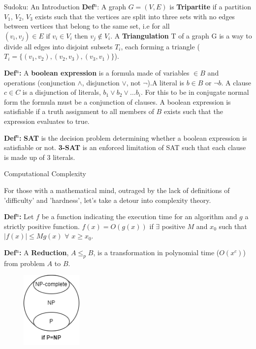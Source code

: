 \documentclass[final]{beamer}
\newlength{\colwidth}
\newcounter{col}
\begin{document}
\begin{frame}[t]
\begin{columns}[t]
\begin{column}{\colwidth}
\begin{exampleblock}{Sudoku: An Introduction}
\textbf{Def$^\text{n}$}: A graph $G=(V,E)$ is \textbf{Tripartite} if a partition $V_1$, $V_2$, $V_3$ exists such that the vertices are split into three sets with no edges between vertices that belong to the same set, i.e for all $(v_i,v_j) \in E\text{ if } v_i \in V_i\text{ then }v_j \not\in V_i $. A \textbf{Triangulation} T of a graph G is a way to divide all edges into disjoint subsets $T_i$, each forming a triangle ($T_i=\{(v_{1}, v_{2}),(v_{2}, v_{3}),(v_{3},v_{1})\}$).

\textbf{Def$^\text{n}$:} A \textbf{boolean expression} is a formula made of variables $\in B$ and operations (conjunction $\land$, disjunction $\lor$, not $\neg$).A literal is $b\in B$ or $\neg b$. A clause $c\in C$ is a disjunction of literals, $b_1 \lor b_2 \lor ... b_i$. For this to be in conjugate normal form the formula must be a conjunction of clauses. A boolean expression is satisfiable if a truth assignment to all members of $B$ exists such that the expression evaluates to true. 

\textbf{Def$^\text{n}$:}  \textbf{SAT} is the decision problem determining whether a boolean expression is satisfiable or not. \textbf{3-SAT} is an enforced limitation of SAT such that each clause is made up of 3 literals. 
  \end{exampleblock}
 \begin{block}{Computational Complexity}


For those with a mathematical mind, outraged by the lack of definitions of 'difficulty' and 'hardness', let's take a detour into complexity theory. 

\textbf{Def$^\text{n}$:} Let $f$ be a function indicating the execution time for an algorithm and $g$ a strictly positive function. $f(x)=O (g(x))$ if $\exists$ positive $ M$ and $x_0$ such that $|f(x)|\leq Mg(x)$ $\forall$ $x\geq x_0$.

\textbf{Def$^\text{n}$:} A \textbf{Reduction}, $A \leq_p B$, is a transformation in polynomial time ($O(x^c)$) from problem $A$ to $B$.

\begin{figure}
		\vspace{-5pt}
		\includegraphics[width=30mm]{np.png}
		\vspace{-40pt}
\end{figure}


\end{block}
\end{column}
\end{columns}
\end{frame}
\end{document}
